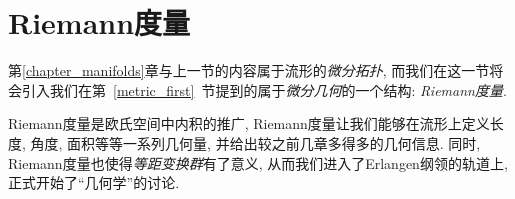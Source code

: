 \section{Riemann度量}
第\ref{chapter_manifolds}章与上一节的内容属于流形的\textit{微分拓扑}, 而我们在这一节将会引入我们在第~\ref{metric_first}~节提到的属于\textit{微分几何}的一个结构: \textit{Riemann度量}.

Riemann度量是欧氏空间中内积的推广, Riemann度量让我们能够在流形上定义长度, 角度, 面积等等一系列几何量, 并给出较之前几章多得多的几何信息.
同时, Riemann度量也使得\textit{等距变换群}有了意义, 从而我们进入了Erlangen纲领的轨道上, 正式开始了``几何学''的讨论.